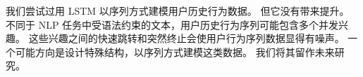 我们尝试过用 LSTM 以序列方式建模用户历史行为数据。
但它没有带来提升。
不同于 NLP 任务中受语法约束的文本，用户历史行为序列可能包含多个并发兴趣。
这些兴趣之间的快速跳转和突然终止会使用户行为序列数据显得有噪声。
一个可能方向是设计特殊结构，以序列方式建模这类数据。
我们将其留作未来研究。




 



